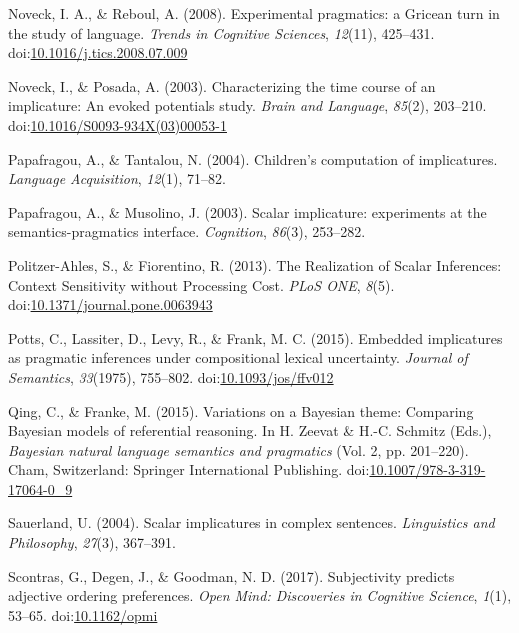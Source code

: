 \documentclass[man]{apa6}
\theoremstyle{definition}
\theoremstyle{definition}
\theoremstyle{definition}
\theoremstyle{remark}
\begin{document}
\hypertarget{ref-noveck2008}{}
Noveck, I. A., \& Reboul, A. (2008). Experimental pragmatics: a Gricean
turn in the study of language. \emph{Trends in Cognitive Sciences},
\emph{12}(11), 425--431.
doi:\href{https://doi.org/10.1016/j.tics.2008.07.009}{10.1016/j.tics.2008.07.009}

\hypertarget{ref-Noveck2003}{}
Noveck, I., \& Posada, A. (2003). Characterizing the time course of an
implicature: An evoked potentials study. \emph{Brain and Language},
\emph{85}(2), 203--210.
doi:\href{https://doi.org/10.1016/S0093-934X(03)00053-1}{10.1016/S0093-934X(03)00053-1}

\hypertarget{ref-Papafragou2004}{}
Papafragou, A., \& Tantalou, N. (2004). Children's computation of
implicatures. \emph{Language Acquisition}, \emph{12}(1), 71--82.

\hypertarget{ref-Papafragou2003}{}
Papafragou, A., \& Musolino, J. (2003). Scalar implicature: experiments at the semantics-pragmatics interface. \emph{Cognition}, \emph{86}(3), 253--282.

\hypertarget{ref-Politzer-Ahles2013}{}
Politzer-Ahles, S., \& Fiorentino, R. (2013). The Realization of Scalar
Inferences: Context Sensitivity without Processing Cost. \emph{PLoS
ONE}, \emph{8}(5).
doi:\href{https://doi.org/10.1371/journal.pone.0063943}{10.1371/journal.pone.0063943}

\hypertarget{ref-Potts2015}{}
Potts, C., Lassiter, D., Levy, R., \& Frank, M. C. (2015). Embedded
implicatures as pragmatic inferences under compositional lexical
uncertainty. \emph{Journal of Semantics}, \emph{33}(1975), 755--802.
doi:\href{https://doi.org/10.1093/jos/ffv012}{10.1093/jos/ffv012}

\hypertarget{ref-Qing2015}{}
Qing, C., \& Franke, M. (2015). Variations on a Bayesian theme:
Comparing Bayesian models of referential reasoning. In H. Zeevat \&
H.-C. Schmitz (Eds.), \emph{Bayesian natural language semantics and
pragmatics} (Vol. 2, pp. 201--220). Cham, Switzerland: Springer
International Publishing.
doi:\href{https://doi.org/10.1007/978-3-319-17064-0_9}{10.1007/978-3-319-17064-0\_9}

\hypertarget{ref-sauerland2004scalar}{}
Sauerland, U. (2004). Scalar implicatures in complex sentences.
\emph{Linguistics and Philosophy}, \emph{27}(3), 367--391.

\hypertarget{ref-Scontras2017}{}
Scontras, G., Degen, J., \& Goodman, N. D. (2017). Subjectivity predicts
adjective ordering preferences. \emph{Open Mind: Discoveries in
Cognitive Science}, \emph{1}(1), 53--65.
doi:\href{https://doi.org/10.1162/opmi}{10.1162/opmi}
\end{document}
